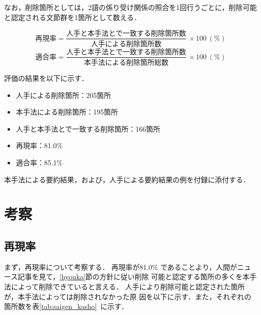 なお，削除箇所としては，2語の係り受け関係の照合を1回行うごとに，削除可能
と認定される文節群を1箇所として数える．

$$
再現率 = \frac{人手と本手法とで一致する削除箇所数}{人手による削除箇所数}
\ × 100\ (\%)
$$
$$
適合率 = \frac{人手と本手法とで一致する削除箇所数}{本手法による削除箇所総数}\ × 
100\ (\%)
$$

評価の結果を以下に示す．
\begin{itemize}
 \setlength{\itemsep}{-1.5mm}
 \item 人手による削除箇所：205箇所
 \item 本手法による削除箇所：195箇所
 \item 人手と本手法とで一致する削除箇所：166箇所
 \item 再現率：81.0\%
 \item 適合率：85.1\%
\end{itemize}

本手法による要約結果，および，人手による要約結果の例を付録に添付する．
\vspace{-4mm}
\section{考察} \label{kousatsu}

\subsection{再現率} \label{kousatus_saigen}
まず，再現率について考察する．
再現率が81.0\%
であることより，人間がニュース記事を見て，\ref{hyouka}節の方針に従い削除
可能と認定する箇所の多くを本手法によって削除できていると言える．
人手により削除可能と認定された箇所が，本手法によっては削除されなかった原
因を以下に示す．また，それぞれの箇所数を表\ref{tab:saigen_kasho}~に示す．

